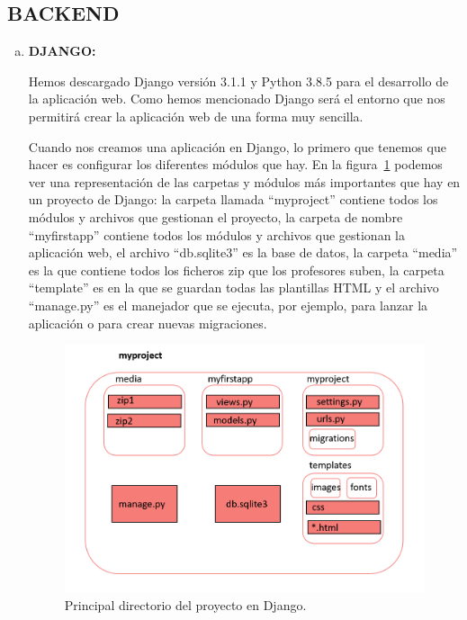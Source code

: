 \documentclass[a4paper, 12pt]{book}
\begin{document}
\subsection{BACKEND}
\begin{enumerate} [a)]
    \item \textbf{DJANGO:}
    
    Hemos descargado Django versión 3.1.1 y Python 3.8.5 para el desarrollo de la aplicación web. Como hemos mencionado Django será el entorno que nos permitirá crear la aplicación web de una forma muy sencilla. 
    
    Cuando nos creamos una aplicación en Django, lo primero que tenemos que hacer es configurar los diferentes módulos que hay. En la figura~\ref{figura:carpetas} podemos ver una representación de las carpetas y módulos más importantes que hay en un proyecto de Django: la carpeta llamada ``myproject'' contiene todos los módulos y archivos que gestionan el proyecto, la carpeta de nombre ``myfirstapp'' contiene todos los módulos y archivos que gestionan la aplicación web, el archivo ``db.sqlite3'' es la base de datos, la carpeta ``media'' es la que contiene todos los ficheros zip que los profesores suben, la carpeta ``template'' es en la que se guardan todas las plantillas HTML y el archivo ``manage.py'' es el manejador que se ejecuta, por ejemplo, para lanzar la aplicación o para crear nuevas migraciones.
     \begin{figure}[h]
            \centering
            \includegraphics[scale=0.6]{img/carpetas.PNG}
            \caption{Principal directorio del proyecto en Django.}
            \label{figura:carpetas}
        \end{figure}
        

\end{enumerate}
\end{document}
